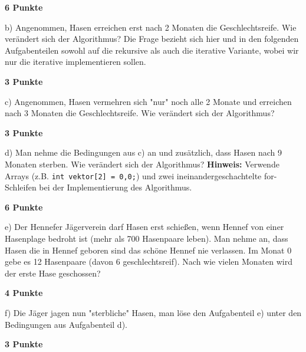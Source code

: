 \documentclass{article}
\begin{document}
\begin{flushright}
	\textbf{6 Punkte}
\end{flushright}

\bigskip

b) Angenommen, Hasen erreichen erst nach 2 Monaten die Geschlechtsreife. Wie verändert sich der Algorithmus? Die Frage bezieht sich hier und in den folgenden Aufgabenteilen sowohl auf die rekursive als auch die iterative Variante, wobei wir nur die iterative implementieren sollen.

\begin{flushright}
	\textbf{3 Punkte}
\end{flushright}

\bigskip

c) Angenommen, Hasen vermehren sich "nur" noch alle 2 Monate und erreichen nach 3 Monaten die Geschlechtsreife. Wie verändert sich der Algorithmus?

\begin{flushright}
	\textbf{3 Punkte}
\end{flushright}

\bigskip

d) Man nehme die Bedingungen aus c) an und zusätzlich, dass Hasen nach 9 Monaten sterben. Wie verändert sich der Algorithmus? \textbf{Hinweis: } Verwende Arrays (z.B. \texttt{int vektor[2] = {0,0};}) und zwei ineinandergeschachtelte for-Schleifen bei der Implementierung des Algorithmus.

\begin{flushright}
	\textbf{6 Punkte}
\end{flushright}

\bigskip

e) Der Hennefer Jägerverein darf Hasen erst schießen, wenn Hennef von einer Hasenplage bedroht ist (mehr als 700 Hasenpaare leben). Man nehme an, dass Hasen die in Hennef geboren sind das schöne Hennef nie verlassen. Im Monat 0 gebe es 12 Hasenpaare (davon 6 geschlechtsreif). Nach wie vielen Monaten wird der erste Hase geschossen?

\begin{flushright}
	\textbf{4 Punkte}
\end{flushright}

\bigskip

f) Die Jäger jagen nun "sterbliche" Hasen, man löse den Aufgabenteil e) unter den Bedingungen aus Aufgabenteil d). 

\begin{flushright}
	\textbf{3 Punkte}
\end{flushright}
\end{document}
